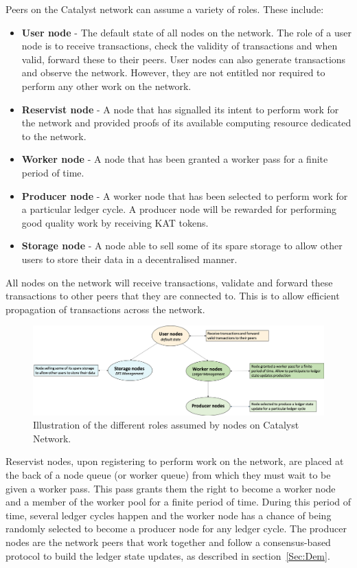 Peers on the Catalyst network can assume a variety of roles. These include:

\begin{itemize}

\item \textbf{User node} - The default state of all nodes on the network. The role of a user node is to receive transactions, check the  validity of transactions and when valid, forward these to their peers. User nodes can also generate transactions and observe the network. However, they are not entitled nor required to perform any other work on the network. 

\item \textbf{Reservist node} - A node that has signalled its intent to perform work for the network and provided proofs of its available computing resource dedicated to the network.

\item \textbf{Worker node} - A node that has been granted a worker pass for a finite period of time. 

\item \textbf{Producer node} - A worker node that has been selected to perform work for a particular ledger cycle. A producer node will be rewarded for performing good quality work by receiving KAT tokens. 

\item \textbf{Storage node} - A node able to sell some of its spare storage to allow other users to store their data in a decentralised manner. 

\end{itemize}

All nodes on the network will receive transactions, validate and forward these transactions to other peers that they are connected to. This is to allow efficient propagation of transactions across the network. \\

\begin{figure}
\centering
\includegraphics[width=12cm]{Figures/Node_roles}
\caption{\label{fig:nr}Illustration of the different roles assumed by nodes on Catalyst Network.}
\end{figure}


Reservist nodes, upon registering to perform work on the network, are placed at the back of a node queue (or worker queue) from which they must wait to be given a worker pass. This pass grants them the right to become a worker node and a member of the worker pool for a finite period of time. During this period of time, several ledger cycles happen and the worker node has a chance of being randomly selected to become a producer node for any ledger cycle. The producer nodes are the network peers that work together and follow a consensus-based protocol to build the ledger state updates, as described in section~\ref{Sec:Dem}. 